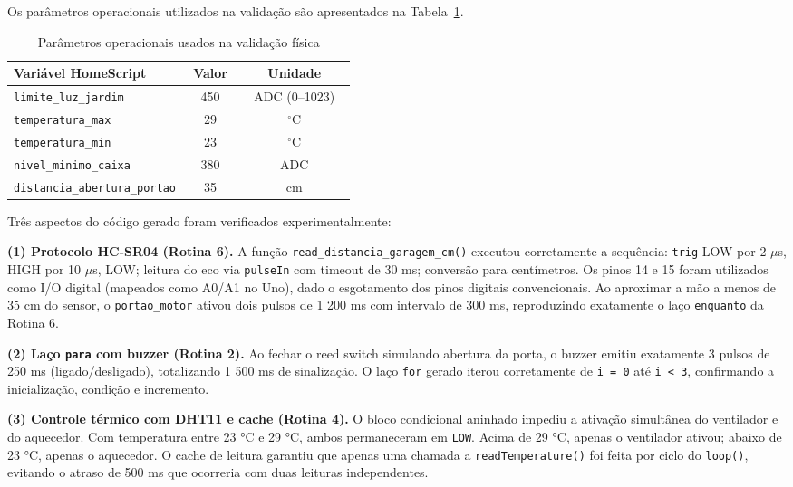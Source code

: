 \documentclass[conference]{IEEEtran}
\begin{document}
Os parâmetros operacionais utilizados na validação são apresentados na
Tabela~\ref{tab:limiares}.

\begin{table}[htbp]
\caption{Parâmetros operacionais usados na validação física}
\label{tab:limiares}
\centering
\begin{tabular}{p{0.44\linewidth}cc}
\toprule
\textbf{Variável HomeScript} & \textbf{Valor} & \textbf{Unidade} \\
\midrule
\texttt{limite\_luz\_jardim}         & 450 & ADC (0--1023) \\
\texttt{temperatura\_max}            &  29 & $^{\circ}$C \\
\texttt{temperatura\_min}            &  23 & $^{\circ}$C \\
\texttt{nivel\_minimo\_caixa}        & 380 & ADC \\
\texttt{distancia\_abertura\_portao} &  35 & cm \\
\bottomrule
\end{tabular}
\end{table}

Três aspectos do código gerado foram verificados experimentalmente:

\textbf{(1) Protocolo HC-SR04 (Rotina 6).} A função
\texttt{read\_distancia\_garagem\_cm()} executou corretamente a sequência:
\texttt{trig} LOW por 2 $\mu$s, HIGH por 10 $\mu$s, LOW; leitura do eco
via \texttt{pulseIn} com timeout de 30 ms; conversão para centímetros.
Os pinos 14 e 15 foram utilizados como I/O digital (mapeados como A0/A1 no
Uno), dado o esgotamento dos pinos digitais convencionais. Ao aproximar a
mão a menos de 35 cm do sensor, o \texttt{portao\_motor} ativou dois pulsos
de 1 200 ms com intervalo de 300 ms, reproduzindo exatamente o laço
\texttt{enquanto} da Rotina 6.

\textbf{(2) Laço \texttt{para} com buzzer (Rotina 2).} Ao fechar o reed
switch simulando abertura da porta, o buzzer emitiu exatamente 3 pulsos de
250 ms (ligado/desligado), totalizando 1 500 ms de sinalização. O laço
\texttt{for} gerado iterou corretamente de \texttt{i = 0} até
\texttt{i < 3}, confirmando a inicialização, condição e incremento.

\textbf{(3) Controle térmico com DHT11 e cache (Rotina 4).} O bloco
condicional aninhado impediu a ativação simultânea do ventilador e do
aquecedor. Com temperatura entre 23 °C e 29 °C, ambos permaneceram em
\texttt{LOW}. Acima de 29 °C, apenas o ventilador ativou; abaixo de
23 °C, apenas o aquecedor. O cache de leitura garantiu que apenas uma
chamada a \texttt{readTemperature()} foi feita por ciclo do \texttt{loop()},
evitando o atraso de 500 ms que ocorreria com duas leituras independentes.
\end{document}
